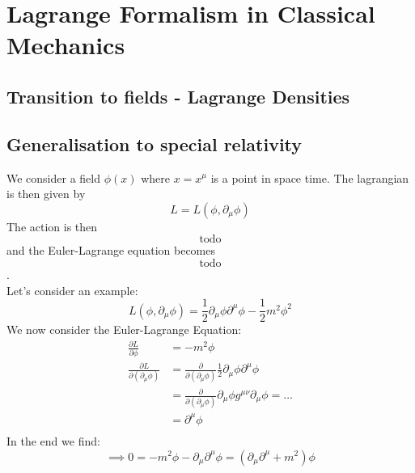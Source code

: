 \documentclass{report}
\begin{document}
\section{Lagrange Formalism in Classical Mechanics}
\subsection{Transition to fields - Lagrange Densities}
\subsection{Generalisation to special relativity}
We consider a field $\phi(x)$ where $x = x^\mu$ is a point in space time. The lagrangian is then given by \[
	L = L\left( \phi, \partial_\mu \phi   \right) 
\] The action is then \[
\text{todo}
\] and the Euler-Lagrange equation becomes 
\[
\text{todo}
\] .\\
Let's consider an example: \[
	L\left( \phi, \partial_\mu \phi   \right) = \frac{1}{2} \partial_\mu \phi \partial^\mu \phi - \frac{1}{2} m^2 \phi^2  
\] 
We now consider the Euler-Lagrange Equation: 
\begin{align*}
	\frac{\partial L}{\partial \phi } &= -m^2\phi  \\
	\frac{\partial L}{\partial \left( \partial_\mu \phi   \right) } &= \frac{\partial }{\partial \left( \partial_\mu \phi  \right) } \frac{1}{2} \partial_\mu \phi \partial^\mu \phi \\ 
		&= \frac{\partial }{\partial \left( \partial_\mu \phi \right) } \partial_\mu \phi g^{\mu \nu} \partial_\mu \phi = \ldots \\ 
		&= \partial^\mu \phi   \\ 
\end{align*}
In the end we find: \[
	\implies 0 = -m^2\phi - \partial_\mu \partial^\mu \phi = \left( \partial_\mu \partial^\mu + m^2 \right) \phi  
\] 
\end{document}

